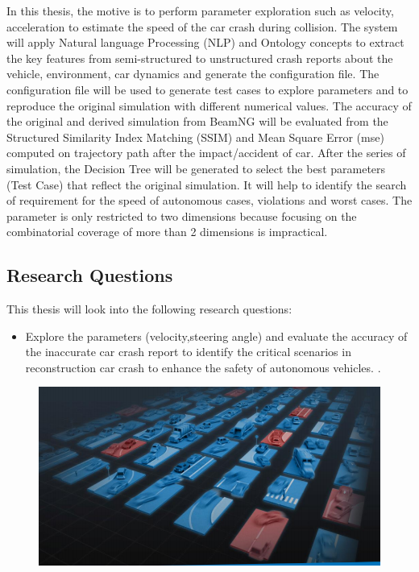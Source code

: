In this thesis, the motive is to perform parameter exploration such as velocity, acceleration to estimate the speed of the car crash during collision.  The system will apply Natural language Processing (NLP) and Ontology concepts to extract the key features from semi-structured to unstructured crash reports about the vehicle, environment, car dynamics and generate the configuration file. The configuration file will be used to generate test cases to explore parameters and to reproduce the original simulation with different numerical values. The accuracy of the original and derived simulation from BeamNG\cite{beamng_research} will be evaluated from the Structured Similarity Index Matching (SSIM) and Mean Square Error (mse) computed on trajectory path after the impact/accident of car. After the series of simulation, the Decision Tree will be generated to select the best parameters (Test Case) that reflect the original simulation. It will help to identify the search of requirement for the speed of autonomous cases, violations and worst cases. The parameter is only restricted to two dimensions because focusing on the combinatorial coverage of more than 2 dimensions is impractical.

\subsection{Research Questions}
This thesis will look into the following research questions:

\begin{itemize}

  \item Explore the parameters (velocity,steering angle) and evaluate the accuracy of the inaccurate car crash report to identify the critical scenarios in reconstruction car crash to enhance the safety of autonomous vehicles.
. 
\end{itemize}

\begin{figure}[H]
\centering
  \includegraphics[scale= 0.4]{pictures/CrashScenarios.png}
  \caption{}
\end{figure}

